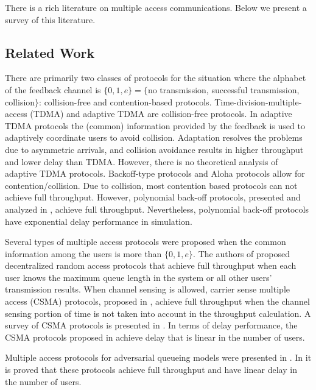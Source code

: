 \documentclass[onecolumn,draftcls]{IEEEtran}
\begin{document}
There is a rich literature on multiple access communications. 
Below we present a survey of this literature.

\subsection*{Related Work}

There are primarily two classes of protocols for the situation where the alphabet of the feedback channel is 
$\{0,1,e\}= \{ $no transmission, successful transmission, collision$\}$:
collision-free and contention-based protocols.
Time-division-multiple-access (TDMA) \cite{rom1990multiple} and adaptive TDMA \cite{papadimitriou2003adaptive, papadimitriou2006high} are collision-free protocols.
In adaptive TDMA protocols the (common) information provided by the feedback is used to adaptively coordinate users to avoid collision.
Adaptation resolves the problems due to asymmetric arrivals, and collision avoidance results in higher throughput and lower delay than TDMA. However, there is no theoretical analysis of adaptive TDMA protocols.
Backoff-type protocols and Aloha protocols \cite{rom1990multiple} allow for contention/collision.
Due to collision, most contention based protocols can not achieve full throughput.
However, polynomial back-off protocols, presented and analyzed in \cite{haastad1996analysis}, achieve full throughput. Nevertheless, polynomial back-off protocols have exponential delay performance in simulation.


Several types of multiple access protocols were proposed when the common information among the users is more than $\{0,1,e\}$.
The authors of \cite{shah2011medium, rajagopalan2009network, shah2012randomized} proposed decentralized random access protocols that achieve full throughput when each user knows the maximum queue length in the system or all other users' transmission results.
When channel sensing is allowed, carrier sense multiple access (CSMA) protocols, proposed in \cite{jiang2010distributed, jiang2011approaching,ni2012q, ghaderi2013fundamental,jiang2012fast,lee2014provable}, achieve full throughput when the channel sensing portion of time is not taken into account in the throughput calculation.
A survey of CSMA protocols is presented in \cite{yun2012optimal}.
In terms of delay performance, the CSMA protocols proposed in \cite{jiang2012fast,lee2014provable} achieve delay that is linear in the number of users. 



Multiple access protocols for adversarial queueing models were presented in \cite{chlebus2012adversarial,anantharamu2009adversarial}.
In \cite{chlebus2012adversarial,anantharamu2009adversarial} it is proved that these protocols achieve full throughput and have linear delay in the number of users.
\end{document}
